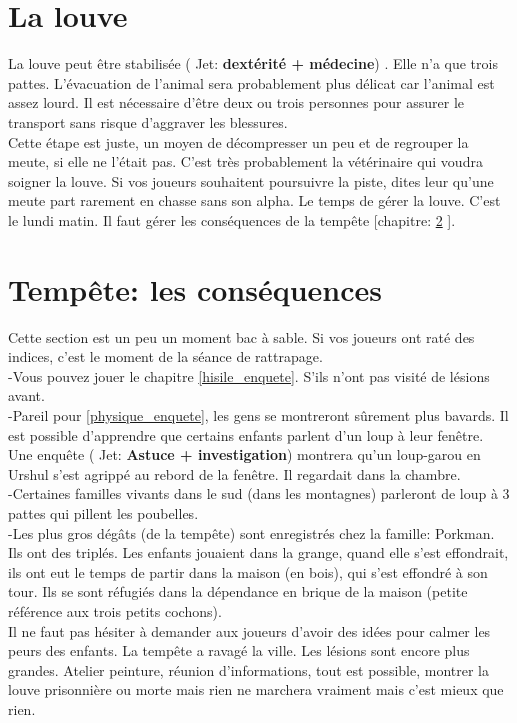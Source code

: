 \documentclass[oneside,12pt]{book}
\newcommand\roll[1]{
( Jet: \textbf{#1})
}
\begin{document}
\begin{flushleft}
\section{La louve}
\label{louve}
La louve peut être stabilisée \roll{dextérité + médecine}. 
Elle n'a que trois pattes. L'évacuation de l'animal sera probablement plus délicat car l'animal est assez lourd. Il est nécessaire d'être deux ou trois personnes pour assurer le transport sans risque d'aggraver les blessures.  \\ 
Cette étape est juste, un moyen de décompresser un peu et de regrouper la meute, si elle ne l'était pas. 
C'est très probablement la vétérinaire qui voudra soigner la louve. 
Si vos joueurs souhaitent poursuivre la piste, dites leur qu'une meute part rarement en chasse sans son alpha. 
Le temps de gérer la louve. C'est le lundi matin. 
Il faut gérer les conséquences de la tempête [chapitre: \ref{consequence} ]. \\


\section{Tempête: les conséquences}
\label{consequence}
Cette section est un peu un moment bac à sable. Si vos joueurs ont raté des indices, c'est le moment de la séance de rattrapage. \\
-Vous pouvez jouer le chapitre \ref{hisile_enquete}. S'ils n'ont pas visité de lésions avant.\\
-Pareil pour \ref{physique_enquete}, les gens se montreront sûrement plus bavards. Il est possible d'apprendre que certains enfants parlent d'un loup à leur fenêtre. Une enquête \roll{Astuce + investigation} montrera qu'un loup-garou en Urshul s'est agrippé au rebord de la fenêtre. Il regardait dans la chambre.\\
-Certaines familles vivants dans le sud (dans les montagnes) parleront de loup à 3 pattes qui pillent les poubelles.\\
-Les plus gros dégâts (de la tempête) sont enregistrés chez la famille: Porkman. Ils ont des triplés. Les enfants jouaient dans la grange, quand elle s'est effondrait, 
ils ont eut le temps de partir dans la maison (en bois), qui s'est effondré à son tour. Ils se sont réfugiés dans la dépendance en brique de la maison (petite référence aux trois petits cochons).\\
Il ne faut pas hésiter à demander aux joueurs d'avoir des idées pour calmer les peurs des enfants. La tempête a ravagé la ville. Les lésions sont encore plus grandes. Atelier peinture, réunion d'informations, tout est possible, montrer la louve prisonnière ou morte mais rien ne marchera vraiment mais c'est mieux que rien.


\end{flushleft}
\end{document}
